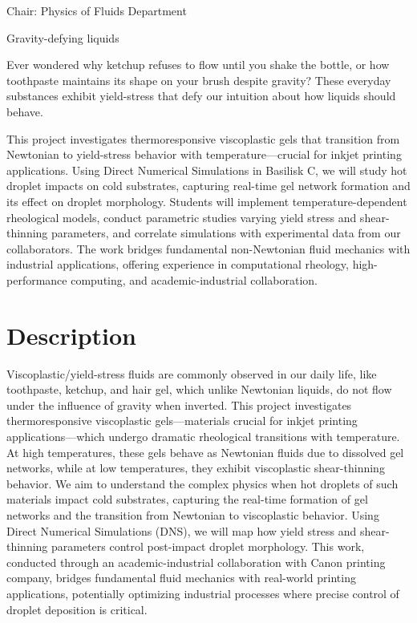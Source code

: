 \documentclass[a4paper,10pt]{article}
\begin{document}
 
\thispagestyle{empty} %

\noindent Chair: Physics of Fluids Department
\begin{center}
 \begin{LARGE}
  Gravity-defying liquids
 \end{LARGE}
\end{center}

\noindent Ever wondered why ketchup refuses to flow until you shake the bottle, or how toothpaste maintains its shape on your brush despite gravity? These everyday substances exhibit yield-stress that defy our intuition about how liquids should behave.

\begin{tcolorbox}[colback=mgray,colframe=mpurple,title=TL;DR]
This project investigates thermoresponsive viscoplastic gels that transition from Newtonian to yield-stress behavior with temperature—crucial for inkjet printing applications. Using Direct Numerical Simulations in Basilisk C, we will study hot droplet impacts on cold substrates, capturing real-time gel network formation and its effect on droplet morphology. Students will implement temperature-dependent rheological models, conduct parametric studies varying yield stress and shear-thinning parameters, and correlate simulations with experimental data from our collaborators. The work bridges fundamental non-Newtonian fluid mechanics with industrial applications, offering experience in computational rheology, high-performance computing, and academic-industrial collaboration.
\end{tcolorbox}

\section*{Description}
Viscoplastic/yield-stress fluids are commonly observed in our daily life, like toothpaste, ketchup, and hair gel, which unlike Newtonian liquids, do not flow under the influence of gravity when inverted. 
This project investigates thermoresponsive viscoplastic gels—materials crucial for inkjet printing applications—which undergo dramatic rheological transitions with temperature. At high temperatures, these gels behave as Newtonian fluids due to dissolved gel networks, while at low temperatures, they exhibit viscoplastic shear-thinning behavior. We aim to understand the complex physics when hot droplets of such materials impact cold substrates, capturing the real-time formation of gel networks and the transition from Newtonian to viscoplastic behavior.
Using Direct Numerical Simulations (DNS), we will map how yield stress and shear-thinning parameters control post-impact droplet morphology. This work, conducted through an academic-industrial collaboration with Canon printing company, bridges fundamental fluid mechanics with real-world printing applications, potentially optimizing industrial processes where precise control of droplet deposition is critical.
\end{document}
